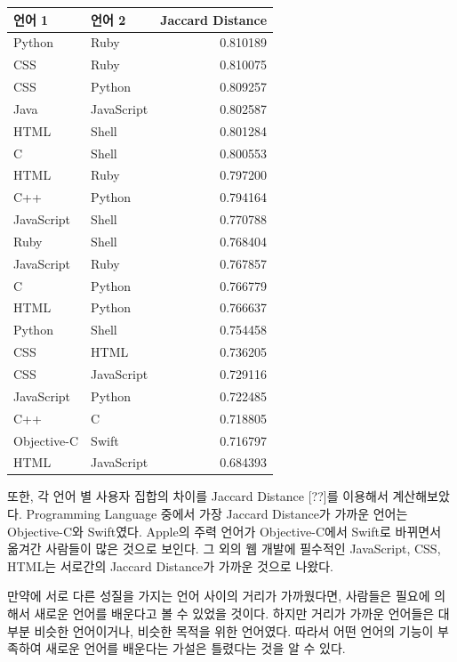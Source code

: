 \documentclass[10pt, a4paper, titlepage]{article}
\begin{document}
\begin{center}
\begin{tabular} {|l|l|r|}
\hline
\rowcolor[gray]{0.8}
언어 1 & 언어 2 & Jaccard Distance \\
\hline

Python & 
Ruby & 
0.810189 \\ \hline
CSS & 
Ruby & 
0.810075 \\ \hline
CSS & 
Python & 
0.809257 \\ \hline
Java & 
JavaScript & 
0.802587 \\ \hline
HTML & 
Shell & 
0.801284 \\ \hline
C & 
Shell & 
0.800553 \\ \hline
HTML & 
Ruby & 
0.797200 \\ \hline
C++ & 
Python & 
0.794164 \\ \hline
JavaScript & 
Shell & 
0.770788 \\ \hline
Ruby & 
Shell & 
0.768404 \\ \hline
JavaScript & 
Ruby & 
0.767857 \\ \hline
C & 
Python & 
0.766779 \\ \hline
HTML & 
Python & 
0.766637 \\ \hline
Python & 
Shell & 
0.754458 \\ \hline
CSS & 
HTML & 
0.736205 \\ \hline
CSS & 
JavaScript & 
0.729116 \\ \hline
JavaScript & 
Python & 
0.722485 \\ \hline
C++ & 
C & 
0.718805 \\ \hline
Objective-C & 
Swift & 
0.716797 \\ \hline
HTML & 
JavaScript & 
0.684393 \\ \hline
\end{tabular}
\end{center}

또한, 각 언어 별 사용자 집합의 차이를 Jaccard Distance [??]를 이용해서 계산해보았다. Programming Language 중에서 가장 Jaccard Distance가 가까운 언어는 Objective-C와 Swift였다. Apple의 주력 언어가 Objective-C에서 Swift로 바뀌면서 옮겨간 사람들이 많은 것으로 보인다. 그 외의 웹 개발에 필수적인 JavaScript, CSS, HTML는 서로간의 Jaccard Distance가 가까운 것으로 나왔다.

만약에 서로 다른 성질을 가지는 언어 사이의 거리가 가까웠다면, 사람들은 필요에 의해서 새로운 언어를 배운다고 볼 수 있었을 것이다. 하지만 거리가 가까운 언어들은 대부분 비슷한 언어이거나, 비슷한 목적을 위한 언어였다. 따라서 어떤 언어의 기능이 부족하여 새로운 언어를 배운다는 가설은 틀렸다는 것을 알 수 있다.
\end{document}
